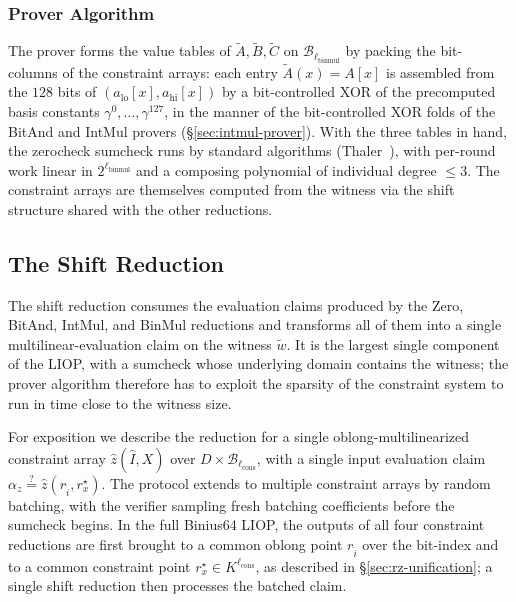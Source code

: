 \documentclass{article}
\theoremstyle{definition}
\newcommand*{\mle}{\widetilde}
\newcommand{\BB}{\mathcal{B}}
\begin{document}
\subsubsection{Prover Algorithm}
\label{sec:binmul-prover}

The prover forms the value tables of $\mle{A}, \mle{B}, \mle{C}$ on $\BB_{\ell_\text{binmul}}$ by packing the bit-columns of the constraint arrays: each entry $\mle{A}(x) = A[x]$ is assembled from the $128$ bits of $(a_\text{lo}[x], a_\text{hi}[x])$ by a bit-controlled XOR of the precomputed basis constants $\gamma^0, \ldots, \gamma^{127}$, in the manner of the bit-controlled XOR folds of the BitAnd and IntMul provers (\S\ref{sec:intmul-prover}). With the three tables in hand, the zerocheck sumcheck runs by standard algorithms (Thaler~\cite[\S 4.1]{Thaler:2022aa}), with per-round work linear in $2^{\ell_\text{binmul}}$ and a composing polynomial of individual degree $\leq 3$. The constraint arrays are themselves computed from the witness via the shift structure shared with the other reductions.

\subsection{The Shift Reduction}
\label{sec:shift-reduction}

The shift reduction consumes the evaluation claims produced by the Zero, BitAnd, IntMul, and BinMul reductions and transforms all of them into a single multilinear-evaluation claim on the witness $\mle{w}$. It is the largest single component of the LIOP, with a sumcheck whose underlying domain contains the witness; the prover algorithm therefore has to exploit the sparsity of the constraint system to run in time close to the witness size.

For exposition we describe the reduction for a single oblong-multilinearized constraint array $\widehat{z}(\widehat{I}, X)$ over $D \times \BB_{\ell_\text{cons}}$, with a single input evaluation claim $\alpha_z \stackrel{?}{=} \widehat{z}(r_{\widehat{i}}, r^\star_x)$. The protocol extends to multiple constraint arrays by random batching, with the verifier sampling fresh batching coefficients before the sumcheck begins. In the full Binius64 LIOP, the outputs of all four constraint reductions are first brought to a common oblong point $r_{\widehat{i}}$ over the bit-index and to a common constraint point $r^\star_x \in K^{\ell_\text{cons}}$, as described in \S\ref{sec:rz-unification}; a single shift reduction then processes the batched claim.
\end{document}
